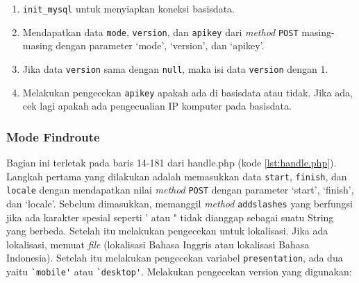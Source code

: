 \begin{enumerate}
\begin{itemize}
	\end{itemize}
	\item \verb!init_mysql! untuk menyiapkan koneksi basisdata.
	\item Mendapatkan data \verb!mode!, \verb!version!, dan \verb!apikey! dari \textit{method} \verb!POST! masing-masing dengan parameter `mode', `version', dan `apikey'.
	\item Jika data \verb!version! sama dengan  \verb!null!, maka isi data \verb!version! dengan 1. 
	\item Melakukan pengecekan \verb!apikey! apakah ada di basisdata atau tidak. Jika ada, cek lagi apakah ada pengecualian IP komputer pada basisdata.
\end{enumerate}

\subsubsection{Mode Findroute}
Bagian ini terletak pada baris 14-181 dari handle.php (kode \ref{lst:handle.php}). Langkah pertama yang dilakukan adalah memasukkan data \verb!start!, \verb!finish!, dan \verb!locale! dengan mendapatkan nilai \textit{method} \verb!POST! dengan parameter `start', `finish', dan `locale'. Sebelum dimasukkan, memanggil \textit{method} \verb!addslashes! yang berfungsi jika ada karakter spesial seperti ' atau " tidak dianggap sebagai suatu String yang berbeda. Setelah itu melakukan pengecekan untuk lokalisasi. Jika ada lokalisasi, memuat \textit{file} (lokalisasi Bahasa Inggris atau lokalisasi Bahasa Indonesia). Setelah itu melakukan pengecekan variabel \verb!presentation!, ada dua yaitu \verb!`mobile'! atau \verb!`desktop'!. Melakukan pengecekan version yang digunakan:
